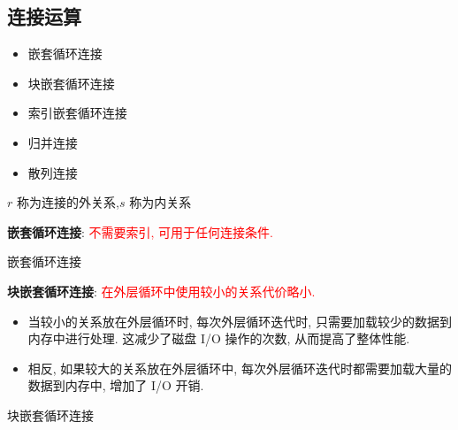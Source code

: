 \subsection{连接运算}

\begin{itemize}
    \item 嵌套循环连接
    \item 块嵌套循环连接
    \item 索引嵌套循环连接
    \item 归并连接
    \item 散列连接
\end{itemize}


$r$ 称为连接的外关系,$s$ 称为内关系

\textbf{嵌套循环连接}: \textcolor{red}{不需要索引, 可用于任何连接条件.}

\begin{algorithm}[H]
    
    \caption{嵌套循环连接}
\end{algorithm}

\textbf{块嵌套循环连接}: \textcolor{red}{在外层循环中使用较小的关系代价略小.}
\begin{itemize}
    \item 当较小的关系放在外层循环时, 每次外层循环迭代时, 只需要加载较少的数据到内存中进行处理. 这减少了磁盘 I/O 操作的次数, 从而提高了整体性能.
    \item 相反, 如果较大的关系放在外层循环中, 每次外层循环迭代时都需要加载大量的数据到内存中, 增加了 I/O 开销.
\end{itemize}

\begin{algorithm}[H]
    \caption{块嵌套循环连接}
\end{algorithm}


